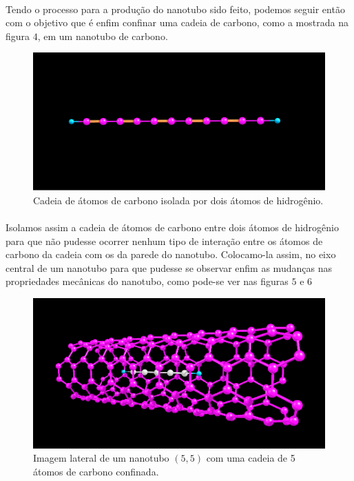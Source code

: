 \documentclass[12pt,a4paper]{report}
\begin{document}
\paragraph{}
Tendo o processo para a produção do nanotubo sido feito, podemos seguir então com o objetivo que é enfim confinar uma cadeia de carbono, como a mostrada na figura $4$, em um nanotubo de carbono.

\begin{figure} [!h]
\centering
\includegraphics[scale=0.3]{chain.png}
\caption{Cadeia de átomos de carbono isolada por dois átomos de hidrogênio.}
\end{figure}

\paragraph{}
Isolamos assim a cadeia de átomos de carbono entre dois átomos de hidrogênio para que não pudesse ocorrer nenhum tipo de interação entre os átomos de carbono da cadeia com os da parede do nanotubo. Colocamo-la assim, no eixo central de um nanotubo para que pudesse se observar enfim as mudanças nas propriedades mecânicas do nanotubo, como pode-se ver nas figuras $5$ e $6$

\begin{figure} [!h]
\centering
\includegraphics[scale=0.5]{cntc1.png}
\caption{Imagem lateral de um nanotubo $(5,5)$ com uma cadeia de 5 átomos de carbono confinada.}
\end{figure} 
\end{document}
